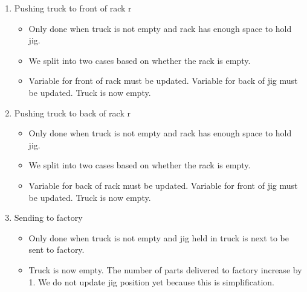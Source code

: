 \documentclass{article}
\begin{document}
\begin{enumerate}
\begin{itemize}
        \item Variable for back of rack must be updated. Truck is now not empty.
    \end{itemize}
    \item Pushing truck to front of rack r    
    \begin{itemize}
        \item Only done when truck is not empty and rack has enough space to hold jig.
        \item We split into two cases based on whether the rack is empty. 
        \item Variable for front of rack must be updated. Variable for back of jig must be updated. Truck is now empty.
    \end{itemize}
    \item Pushing truck to back of rack r   
    \begin{itemize}
        \item Only done when truck is not empty and rack has enough space to hold jig.
        \item We split into two cases based on whether the rack is empty. 
        \item Variable for back of rack must be updated. Variable for front of jig must be updated. Truck is now empty.
    \end{itemize}
    \item Sending to factory    
    \begin{itemize}
        \item Only done when truck is not empty and jig held in truck is next to be sent to factory.
        \item Truck is now empty. The number of parts delivered to factory increase by 1. We do not update jig position yet because this is simplification.
    \end{itemize}
\end{enumerate}



\end{document}
